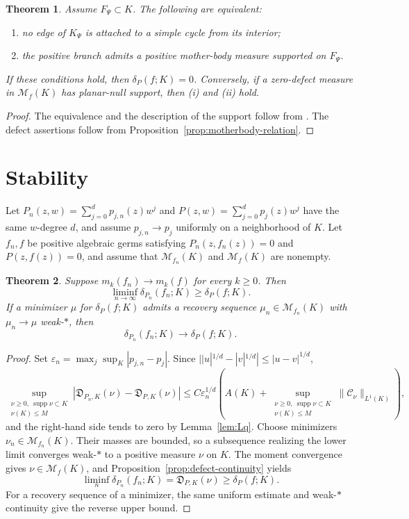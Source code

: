 \documentclass[10pt,a4paper]{amsart}
\newtheorem{theorem}{Theorem}[section]
\newcommand{\M}{\mathcal M}
\newcommand{\Cauchy}{\mathcal C}
\newcommand{\supp}{\operatorname{supp}}
\begin{document}
\begin{theorem}\label{thm:strebel-zero}
Assume $F_\Psi\subset K$.  The following are equivalent:
\begin{enumerate}[label=\textup{(\roman*)}]
\item no edge of $K_\Psi$ is attached to a simple cycle from its interior;
\item the positive branch admits a positive mother-body measure supported on
$F_\Psi$.
\end{enumerate}
If these conditions hold, then $\delta_P(f;K)=0$.  Conversely, if a zero-defect
measure in $\M_f(K)$ has planar-null support, then \textup{(i)} and
\textup{(ii)} hold.
\end{theorem}

\begin{proof}
The equivalence and the description of the support follow from
\cite[Theorem~13 and Proposition~14]{BoSh}.  The defect assertions follow from
Proposition~\ref{prop:motherbody-relation}.
\end{proof}

\section{Stability}\label{sec:stability}

Let $P_n(z,w)=\sum_{j=0}^dp_{j,n}(z)w^j$ and
$P(z,w)=\sum_{j=0}^dp_j(z)w^j$ have the same $w$-degree $d$, and assume
$p_{j,n}\to p_j$ uniformly on a neighborhood of $K$.  Let $f_n,f$ be positive
algebraic germs satisfying $P_n(z,f_n(z))=0$ and $P(z,f(z))=0$, and assume that
$\M_{f_n}(K)$ and $\M_f(K)$ are nonempty.

\begin{theorem}\label{thm:stability}
Suppose $m_k(f_n)\to m_k(f)$ for every $k\ge0$.  Then
\[
 \liminf_{n\to\infty}\delta_{P_n}(f_n;K)\ge\delta_P(f;K).
\]
If a minimizer $\mu$ for $\delta_P(f;K)$ admits a recovery sequence
$\mu_n\in\M_{f_n}(K)$ with $\mu_n\to\mu$ weak-$*$, then
\[
 \delta_{P_n}(f_n;K)\longrightarrow\delta_P(f;K).
\]
\end{theorem}

\begin{proof}
Set
$\varepsilon_n=\max_j\sup_K|p_{j,n}-p_j|$.  Since
$||u|^{1/d}-|v|^{1/d}|\le|u-v|^{1/d}$,
\[
 \sup_{\substack{\nu\ge0,\ \supp\nu\subset K\\ \nu(K)\le M}}
 |\mathfrak D_{P_n,K}(\nu)-\mathfrak D_{P,K}(\nu)|
 \le C\varepsilon_n^{1/d}
 \left(A(K)+
 \sup_{\substack{\nu\ge0,\ \supp\nu\subset K\\ \nu(K)\le M}}
 \|\Cauchy_\nu\|_{L^1(K)}\right),
\]
and the right-hand side tends to zero by Lemma~\ref{lem:Lq}.  Choose minimizers
$\nu_n\in\M_{f_n}(K)$.  Their masses are bounded, so a subsequence realizing
the lower limit converges weak-$*$ to a positive measure $\nu$ on $K$.  The
moment convergence gives $\nu\in\M_f(K)$, and
Proposition~\ref{prop:defect-continuity} yields
\[
 \liminf_n\delta_{P_n}(f_n;K)
 =\mathfrak D_{P,K}(\nu)\ge\delta_P(f;K).
\]
For a recovery sequence of a minimizer, the same uniform estimate and weak-$*$
continuity give the reverse upper bound.
\end{proof}
\end{document}
